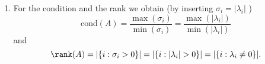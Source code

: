 {\begin{enumerate}
\begin{align*}
{{\begin{pmatrix}
		           &       &|\lambda_r| & &\\
		           &       &            & \ddots&\\
                   0&      &            & &0\\		
		\end{pmatrix}
	}_{\textcolor{blue}{=:\Sigma=\text{diag}(\sigma_1,\ldots,\sigma_r)}}}_{\textcolor{violet}{=V\Lambda}}\underbrace{\begin{pmatrix}-&v_1^\top&-\\ &\vdots& \\-&v_n^\top&-\end{pmatrix}}_{\textcolor{blue}{V^\top}}~~\textcolor{red}{[SVD]}
	\end{align*}
	~\\
	$A$ symmetric and positive definite $\Rightarrow~|\lambda_i|=\lambda_i>0~\Rightarrow~\frac{\lambda_i}{|\lambda_i|}=1$. Thus:\\
	$$\textcolor{blue}{\text{("For spd matrices: SVD = Eigendecomposition!")}}$$
	\item For the condition and the rank we obtain (by inserting $\sigma_i=|\lambda_i|$ )
	$$\text{cond}(A) =  \frac{\max(\sigma_i)}{\min(\sigma_i)} =  \frac{\max(|\lambda_i|)}{\min(|\lambda_i|)}$$
	and
	$$\rank(A) = |\{i: \sigma_i > 0 \}| = |\{i: |\lambda_i| > 0 \}|= |\{i: \lambda_i \neq 0 \}|.$$
\end{enumerate}
}